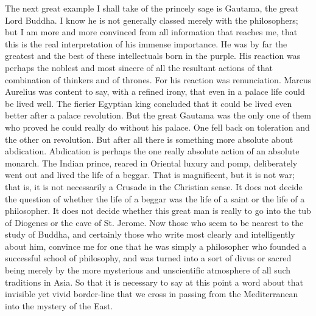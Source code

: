 The next great example I shall take of the princely sage is Gautama, the great Lord Buddha. I know he is not generally classed merely with the philosophers; but I am more and more convinced from all information that reaches me, that this is the real interpretation of his immense importance. He was by far the greatest and the best of these intellectuals born in the purple. His reaction was perhaps the noblest and most sincere of all the resultant actions of that combination of thinkers and of thrones. For his reaction was renunciation. Marcus Aurelius was content to say, with a refined irony, that even in a palace life could be lived well. The fierier Egyptian king concluded that it could be lived even better after a palace revolution. But the great Gautama was the only one of them who proved he could really do without his palace. One fell back on toleration and the other on revolution. But after all there is something more absolute about abdication. Abdication is perhaps the one really absolute action of an absolute monarch. The Indian prince, reared in Oriental luxury and pomp, deliberately went out and lived the life of a beggar. That is magnificent, but it is not war; that is, it is not necessarily a Crusade in the Christian sense. It does not decide the question of whether the life of a beggar was the life of a saint or the life of a philosopher. It does not decide whether this great man is really to go into the tub of Diogenes or the cave of St. Jerome. Now those who seem to be nearest to the study of Buddha, and certainly those who write most clearly and intelligently about him, convince me for one that he was simply a philosopher who founded a successful school of philosophy, and was turned into a sort of divus or sacred being merely by the more mysterious and unscientific atmosphere of all such traditions in Asia. So that it is necessary to say at this point a word about that invisible yet vivid border-line that we cross in passing from the Mediterranean into the mystery of the East.


